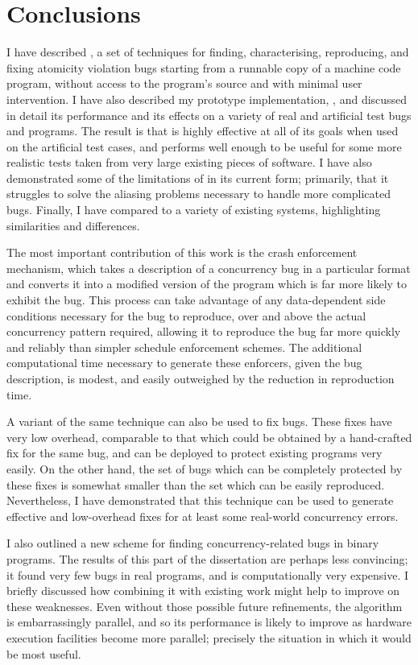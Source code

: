 \cleardoublepage
\chapter{Conclusions}
\label{sect:concl}

I have described {\technique}, a set of techniques for finding,
characterising, reproducing, and fixing atomicity violation bugs
starting from a runnable copy of a machine code program, without
access to the program's source and with minimal user intervention.  I
have also described my prototype implementation, {\implementation},
and discussed in detail its performance and its effects on a variety
of real and artificial test bugs and programs.  The result is that
{\technique} is highly effective at all of its goals when used on the
artificial test cases, and performs well enough to be useful for some
more realistic tests taken from very large existing pieces of
software.  I have also demonstrated some of the limitations of
{\technique} in its current form; primarily, that it struggles to
solve the aliasing problems necessary to handle more complicated bugs.
Finally, I have compared {\technique} to a variety of existing
systems, highlighting similarities and differences.

The most important contribution of this work is the crash enforcement
mechanism, which takes a description of a concurrency bug in a
particular format and converts it into a modified version of the
program which is far more likely to exhibit the bug.  This process can
take advantage of any data-dependent side conditions necessary for the
bug to reproduce, over and above the actual concurrency pattern
required, allowing it to reproduce the bug far more quickly and
reliably than simpler schedule enforcement schemes.  The additional
computational time necessary to generate these enforcers, given the
bug description, is modest, and easily outweighed by the reduction in
reproduction time.

A variant of the same technique can also be used to fix bugs.  These
fixes have very low overhead, comparable to that which could be
obtained by a hand-crafted fix for the same bug, and can be deployed
to protect existing programs very easily.  On the other hand, the set
of bugs which can be completely protected by these fixes is somewhat
smaller than the set which can be easily reproduced.  Nevertheless, I
have demonstrated that this technique can be used to generate
effective and low-overhead fixes for at least some real-world
concurrency errors.

I also outlined a new scheme for finding concurrency-related bugs in
binary programs.  The results of this part of the dissertation are
perhaps less convincing; it found very few bugs in real programs, and
is computationally very expensive.  I briefly discussed how combining
it with existing work might help to improve on these weaknesses.  Even
without those possible future refinements, the algorithm is
embarrassingly parallel, and so its performance is likely to improve
as hardware execution facilities become more parallel; precisely the
situation in which it would be most useful.
